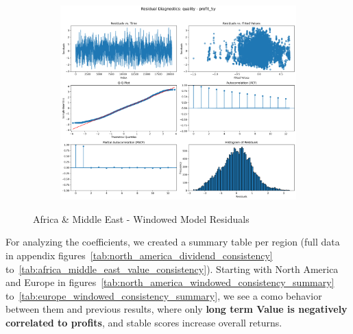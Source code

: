 \documentclass[11pt,english,a4paper,hidelinks]{book}
\begin{document}
\begin{figure}[H]
\begin{subfigure}[b]{0.32\textwidth}
    \end{subfigure}
    \hfill
    \begin{subfigure}[b]{0.32\textwidth}
        \centering
        \includegraphics[width=\textwidth]{images/code/models/linear_regression/first_model/AF/quality_profit_5y_residuals - Gaussian.png}
    \end{subfigure}
    \caption{Africa \& Middle East - Windowed Model Residuals}
    \label{fig:linear_regression_AF_residues_windowed}
\end{figure}

\noindent For analyzing the coefficients, we created a summary table per region (full data in appendix figures~\ref{tab:north_america_dividend_consistency} to~\ref{tab:africa_middle_east_value_consistency}). Starting with North America and Europe in figures~\ref{tab:north_america_windowed_consistency_summary} to~\ref{tab:europe_windowed_consistency_summary}, we see a como behavior between them and previous results, where only \textbf{long term Value is negatively correlated to profits}, and stable scores increase overall returns.
\end{document}
